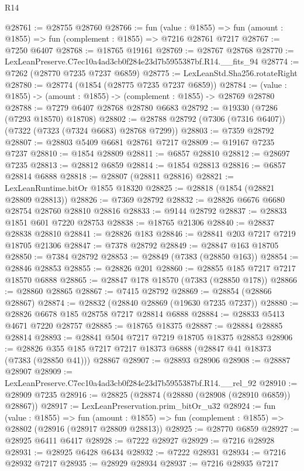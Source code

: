 \begin{lexlean}{R14}
\begin{coremodule}
@28761 := @28755 @28760
@28766 := fun (value : @1855) =>
  fun (amount : @1855) => fun (complement : @1855) => @7216 @28761 @7217
@28767 := @7250 @6407
@28768 := @18765 @19161
@28769 := @28767 @28768
@28770 := LexLeanPreserve.C7ec10a4ad3cb0f284e23d7b5955387bf.R14.__fits_94
@28774 := @7262 (@28770 @7235 @7237 @6859)
@28775 := LexLeanStd.Sha256.rotateRight
@28780 := @28774 (@1854 (@28775 @7235 @7237 @6859))
@28784 := (value : @1855) -> (amount : @1855) -> (complement : @1855) -> @28769 @28780
@28788 := @7279 @6407 @28768 @28780 @6683
@28792 := @19330 (@7286 (@7293 @18570) @18708)
@28802 := @28788 @28792 (@7306 (@7316 @6407)) (@7322 (@7323 (@7324 @6683) @28768 @7299))
@28803 := @7359 @28792
@28807 := @28803 @5409 @6681 @28761 @7217
@28809 := @19167 @7235 @7237
@28810 := @1854 @28809
@28811 := @6857 @28810
@28812 := @28697 @7235
@28813 := @28812 @6859
@28814 := @1854 @28813
@28816 := @6857 @28814 @6888
@28818 := @28807 (@28811 @28816)
@28821 := LexLeanRuntime.bitOr @1855 @18320
@28825 := @28818 (@1854 (@28821 @28809 @28813))
@28826 := @7369 @28792
@28832 := @28826 @6676 @6680 @28754 @28760 @28810 @28816
@28833 := @9144 @28792
@28837 := @28833 @1851 @601 @7220 @28753
@28838 := @18765 @21306
@28840 := @28837 @28838 @28810
@28841 := @28826 @183
@28846 := @28841 @203 @7217 @7219 @18705 @21306
@28847 := @7378 @28792
@28849 := @28847 @163 @18705
@28850 := @7384 @28792
@28853 := @28849 (@7383 (@28850 @163))
@28854 := @28846 @28853
@28855 := @28826 @201
@28860 := @28855 @185 @7217 @7217 @18570 @6888
@28865 := @28847 @178 @18570 (@7383 (@28850 @178))
@28866 := @28860 @28865
@28867 := @7415 @28792
@28869 := @28854 (@28866 @28867)
@28874 := @28832 (@28840 @28869 (@19630 @7235 @7237))
@28880 := @28826 @6678 @185 @28758 @7217 @28814 @6888
@28884 := @28833 @5413 @4671 @7220 @28757
@28885 := @18765 @18375
@28887 := @28884 @28885 @28814
@28893 := @28841 @504 @7217 @7219 @18705 @18375 @28853
@28906 := @28826 @355 @185 @7217 @7217 @18373 @6888 (@28847 @41 @18373 (@7383 (@28850 @41))) @28867
@28907 := @28893 @28906
@28908 := @28887 @28907
@28909 := LexLeanPreserve.C7ec10a4ad3cb0f284e23d7b5955387bf.R14.__rel_92
@28910 := @28909 @7235
@28916 := @28825 (@28874 (@28880 (@28908 (@28910 @6859)) @28867))
@28917 := LexLeanPreservation.prim_bitOr_u32
@28924 := fun (value : @1855) =>
  fun (amount : @1855) => fun (complement : @1855) => @28802 (@28916 (@28917 @28809 @28813))
@28925 := @28770 @6859
@28927 := @28925 @6411 @6417
@28928 := @7222 @28927
@28929 := @7216 @28928
@28931 := @28925 @6428 @6434
@28932 := @7222 @28931
@28934 := @7216 @28932 @7217
@28935 := @28929 @28934
@28937 := @7216 @28935 @7217

\end{coremodule}
\end{lexlean}
